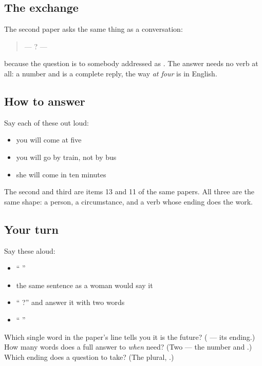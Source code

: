 \subsection*{The exchange}
The second paper asks the same thing as a conversation:

\begin{quote}
—   ? —  
\end{quote}

\textbf{} because the question is to somebody addressed as \textbf{}. The answer needs no verb at all: a number and \textbf{} is a complete reply, the way \emph{at four} is in English.

\subsection*{How to answer}
Say each of these out loud:

\begin{itemize}
\raggedright
  \item you will come at five
  \item you will go by train, not by bus
  \item she will come in ten minutes
\end{itemize}

The second and third are items 13 and 11 of the same papers. All three are the same shape: a person, a circumstance, and a verb whose ending does the work.

\subsection*{Your turn}
Say these aloud:

\begin{itemize}
\raggedright
  \item \textquotedblleft{}   \textquotedblright{}
  \item the same sentence as a woman would say it
  \item \textquotedblleft{}  ?\textquotedblright{} and answer it with two words
  \item \textquotedblleft{} \textquotedblright{}
\end{itemize}

\begin{tcolorbox}[breakable,colback=teal!4,colframe=teal!35!black,title={Before you move on}]
Which single word in the paper's line tells you it is the future? (\textbf{} — its ending.) How many words does a full answer to \emph{when} need? (Two — the number and \textbf{}.) Which ending does a question to \textbf{} take? (The plural, \textbf{}.)
\end{tcolorbox}
